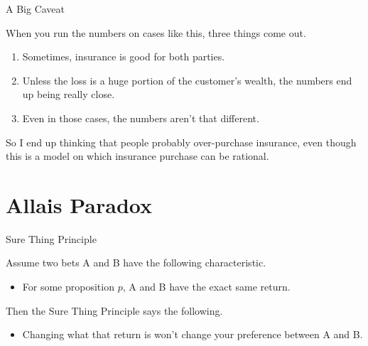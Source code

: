 \documentclass[
  ignorenonframetext,
]{beamer}
\providecommand{\tightlist}{%
  \setlength{\itemsep}{0pt}\setlength{\parskip}{0pt}}
\renewcommand{\,}{\text{, }}
\begin{document}
\begin{frame}{A Big Caveat}
\protect\hypertarget{a-big-caveat}{}

When you run the numbers on cases like this, three things come out.

\begin{enumerate}
\tightlist
\item
  Sometimes, insurance is good for both parties. \pause
\item
  Unless the loss is a huge portion of the customer's wealth, the
  numbers end up being really close. \pause
\item
  Even in those cases, the numbers aren't that different.
\end{enumerate}

So I end up thinking that people probably over-purchase insurance, even
though this is a model on which insurance purchase can be rational.

\end{frame}

\hypertarget{allais-paradox}{%
\section{Allais Paradox}\label{allais-paradox}}

\begin{frame}{Sure Thing Principle}
\protect\hypertarget{sure-thing-principle}{}

Assume two bets A and B have the following characteristic.

\begin{itemize}
\tightlist
\item
  For some proposition \(p\), A and B have the exact same return. \pause
\end{itemize}

Then the Sure Thing Principle says the following.

\begin{itemize}
\tightlist
\item
  Changing what that return is won't change your preference between A
  and B.
\end{itemize}

\end{frame}
\end{document}
